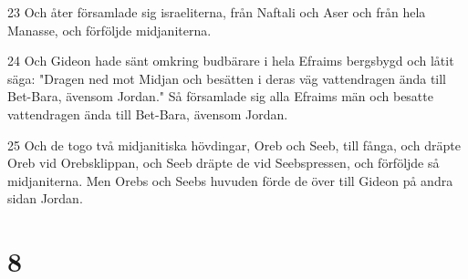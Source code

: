 \par 23 Och åter församlade sig israeliterna, från Naftali och Aser och från hela Manasse, och förföljde midjaniterna.
\par 24 Och Gideon hade sänt omkring budbärare i hela Efraims bergsbygd och låtit säga: "Dragen ned mot Midjan och besätten i deras väg vattendragen ända till Bet-Bara, ävensom Jordan." Så församlade sig alla Efraims män och besatte vattendragen ända till Bet-Bara, ävensom Jordan.
\par 25 Och de togo två midjanitiska hövdingar, Oreb och Seeb, till fånga, och dräpte Oreb vid Orebsklippan, och Seeb dräpte de vid Seebspressen, och förföljde så midjaniterna. Men Orebs och Seebs huvuden förde de över till Gideon på andra sidan Jordan.

\chapter{8}

